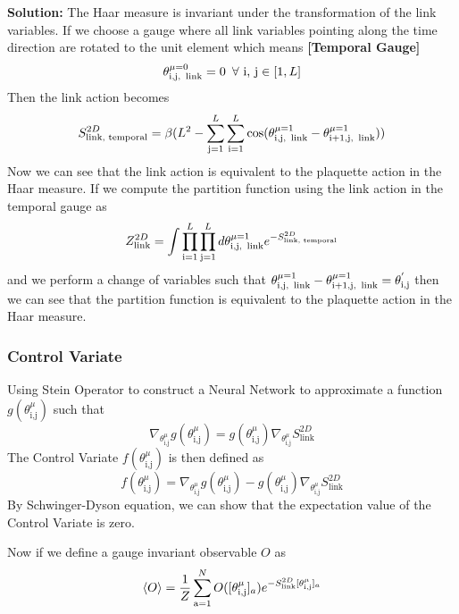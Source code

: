 \textbf{Solution:}
The Haar measure is invariant under the transformation of the link variables. If we choose a gauge where all link variables pointing along the time direction are rotated to the unit element which means \textbf{[Temporal Gauge]} $$\theta^{\mu=0}_{\text{i,j,\, link}} = 0 \,\,\,\forall\,\,\text{i, j}\in[1, L]$$
Then the link action becomes
\begin{equation}
    S_{\text{link, temporal}}^{2D} = \beta(L^2- \sum_{\text{j}=1}^{L}\sum_{\text{i}=1}^{L}\cos(\theta_{\text{i,j, \,link}}^{\mu=1}-\theta_{\text{i+1,j, \,link}}^{\mu=1}))
\end{equation}
Now we can see that the link action is equivalent to the plaquette action in the Haar measure. If we compute the partition function using the link action in the temporal gauge as
\begin{equation}
    Z^{2D}_{\text{link}} = \int \prod_{\text{i}=1}^{L}\prod_{\text{j}=1}^{L}d\theta_{\text{i,j, \,link}}^{\mu=1}e^{-S_{\text{link, temporal}}^{2D}}
\end{equation}
and we perform a change of variables such that $\theta_{\text{i,j, \,link}}^{\mu=1}  - \theta_{\text{i+1,j, \,link}}^{\mu=1}= \theta^{'}_{\text{i,j}}$ then we can see that the partition function is equivalent to the plaquette action in the Haar measure.

\subsubsection*{Control Variate}
Using Stein Operator to construct a Neural Network to approximate a function $g(\theta^{\mu}_{\text{i,j}})$ such that
\begin{equation}
    \nabla_{\theta^{\mu}_{\text{i,j}}}g(\theta^{\mu}_{\text{i,j}}) = g(\theta^{\mu}_{\text{i,j}})\nabla_{\theta^{\mu}_{\text{i,j}}}S_{\text{link}}^{2D}
\end{equation}
The Control Variate $f(\theta^{\mu}_{\text{i,j}})$ is then defined as
\begin{equation}
    f(\theta^{\mu}_{\text{i,j}}) =
    \nabla_{\theta^{\mu}_{\text{i,j}}}g(\theta^{\mu}_{\text{i,j}}) - g(\theta^{\mu}_{\text{i,j}})\nabla_{\theta^{\mu}_{\text{i,j}}}S_{\text{link}}^{2D}
\end{equation}
By Schwinger-Dyson equation, we can show that the expectation value of the Control Variate is zero.

Now if we define a gauge invariant observable $O$ as
    \begin{equation}
        \braket{O} = \frac{1}{Z}\sum_{\text{a}=1}^{N}O([\theta^{\mu}_{\text{i,j}}]_a)e^{-S_{\text{link}}^{2D}[{\theta^{\mu}_{\text{i,j}}}]_a}
    \end{equation}